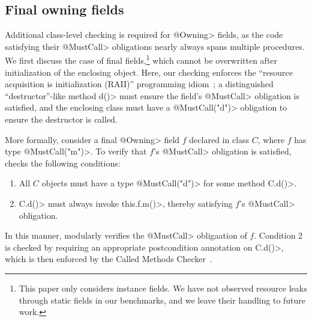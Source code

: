 

\subsection{Final owning fields}
\label{sec:owning-fields}

  Additional class-level checking is required for \<@Owning>
  fields, as the code
  satisfying their \<@MustCall> obligations nearly always spans multiple
  procedures.  We first discuss the case of final fields,\footnote{This paper only
  considers instance fields.  We have not observed resource leaks
  through static fields in our benchmarks, and we leave their handling to future
  work.} which cannot be overwritten after initialization of the enclosing
  object.  Here, our checking enforces the ``resource acquisition is
  initialization (RAII)'' programming idiom~\cite{raii}; a distinguished
  ``destructor''-like method \<d()> must ensure the field's \<@MustCall> obligation is
  satisfied, and the enclosing class must have a \<@MustCall("d")> obligation to
  ensure the destructor is called.

  More formally, consider a final \<@Owning> field $f$ declared in class $C$,
  where
  $f$ has type \<@MustCall("m")>.  To
  verify that $f$'s \<@MustCall> obligation is satisfied, \Tool checks the following
  conditions:
  \begin{enumerate}
    \item All $C$ objects must have a type \<@MustCall("d")> for some method \<C.d()>.
    \item \<C.d()> must always invoke \<this.f.m()>, thereby satisfying $f$'s
    \<@MustCall> obligation.
  \end{enumerate}
  In this manner, \Tool modularly verifies the \<@MustCall> obligaation of $f$.  Condition 2 is
  checked by requiring an appropriate \EnsuresCalledMethods
  postcondition annotation on
  \<C.d()>, which is then enforced by the Called Methods
  Checker~\cite{KelloggRSSE2020}.   


